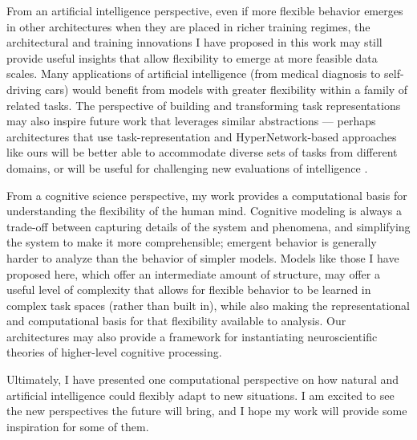 From an artificial intelligence perspective, even if more flexible behavior emerges in other architectures when they are placed in richer training regimes, the architectural and training innovations I have proposed in this work may still provide useful insights that allow flexibility to emerge at more feasible data scales. Many applications of artificial intelligence (from medical diagnosis to self-driving cars) would benefit from models with greater flexibility within a family of related tasks. The perspective of building and transforming task representations may also inspire future work that leverages similar abstractions --- perhaps architectures that use task-representation and HyperNetwork-based approaches like ours will be better able to accommodate diverse sets of tasks from different domains, or will be useful for challenging new evaluations of intelligence \citep[e.g.][]{Chollet2019}. \par 

From a cognitive science perspective, my work provides a computational basis for understanding the flexibility of the human mind. Cognitive modeling is always a trade-off between capturing details of the system and phenomena, and simplifying the system to make it more comprehensible; emergent behavior is generally harder to analyze than the behavior of simpler models. Models like those I have proposed here, which offer an intermediate amount of structure, may offer a useful level of complexity that allows for flexible behavior to be learned in complex task spaces (rather than built in), while also making the representational and computational basis for that flexibility available to analysis. Our architectures may also provide a framework for instantiating neuroscientific theories of higher-level cognitive processing. \par 

Ultimately, I have presented one computational perspective on how natural and artificial intelligence could flexibly adapt to new situations. I am excited to see the new perspectives the future will bring, and I hope my work will provide some inspiration for some of them. 
